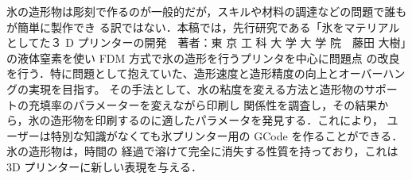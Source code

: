 氷の造形物は彫刻で作るのが一般的だが，スキルや材料の調達などの問題で誰もが簡単に製作でき
る訳ではない．本稿では，先行研究である「氷をマテリアルとしてた３ D プリンターの開発　著者：東 京
工 科 大 学 大 学 院　藤田 大樹」の液体窒素を使い FDM 方式で氷の造形を行うプリンタを中心に問題点
の改良を行う．特に問題として抱えていた、造形速度と造形精度の向上とオーバーハングの実現を目指す。
その手法として、水の粘度を変える方法と造形物のサポートの充填率のパラメーターを変えながら印刷し
関係性を調査し，その結果から，氷の造形物を印刷するのに適したパラメータを発見する．これにより，
ユーザーは特別な知識がなくても氷プリンター用の GCode を作ることができる．氷の造形物は，時間の
経過で溶けて完全に消失する性質を持っており，これは 3D プリンターに新しい表現を与える．

